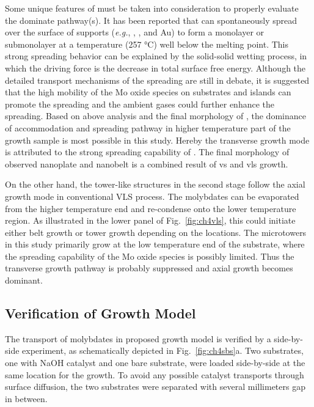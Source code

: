 Some unique features of  must be taken into consideration to properly evaluate the dominate pathway(s). It has been reported that  can spontaneously spread over the surface of supports (\emph{e.g.}, , , and Au) to form a monolayer or submonolayer at a temperature (257 \si{\degreeCelsius}) well below the melting point.\cite{Leyrer1990} This strong spreading behavior can be explained by the solid-solid wetting process, in which the driving force is the decrease in total surface free energy.\cite{Leyrer1988} Although the detailed transport mechanisms of the spreading are still in debate, it is suggested that the high mobility of the Mo oxide species on substrates and  islands can promote the spreading and the ambient gases could further enhance the spreading.\cite{Gunther2000, Song2003} Based on above analysis and the final morphology of , the dominance of accommodation and spreading pathway in higher temperature part of the growth sample is most possible in this study. Hereby the transverse growth mode is attributed to the strong spreading capability of . The final morphology of observed nanoplate and nanobelt is a combined result of \gls{vs} and \gls{vls} growth. 

On the other hand, the tower-like structures in the second stage follow the axial growth mode in conventional VLS process. The molybdates can be evaporated from the higher temperature end and re-condense onto the lower temperature region. As illustrated in the lower panel of Fig.~\ref{fig:ch4vls}, this could initiate either belt growth or tower growth depending on the locations. The microtowers in this study primarily grow at the low temperature end of the substrate, where the spreading capability of the Mo oxide species is possibly limited. Thus the transverse growth pathway is probably suppressed and axial growth becomes dominant.

\subsection{Verification of Growth Model} 

The transport of molybdates in proposed growth model is verified by a side-by-side experiment, as schematically depicted in Fig.~\ref{fig:ch4sbs}a. Two substrates, one with NaOH catalyst and one bare substrate, were loaded side-by-side at the same location for the growth. To avoid any possible catalyst transports through surface diffusion, the two substrates were separated with several millimeters gap in between. 

